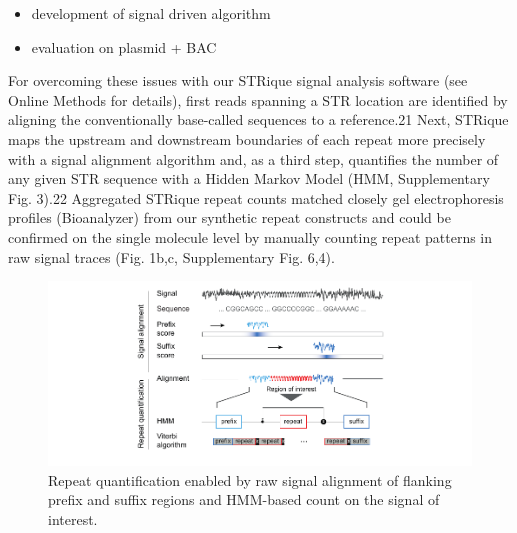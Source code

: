 \begin{itemize}
	\item development of signal driven algorithm
	\item evaluation on plasmid + BAC
\end{itemize}

For overcoming these issues with our STRique signal analysis software (see Online Methods for details), first reads spanning a STR location are identified by aligning the conventionally base-called sequences to a reference.21 Next, STRique maps the upstream and downstream boundaries of each repeat more precisely with a signal alignment algorithm and, as a third step, quantifies the number of any given STR sequence with a Hidden Markov Model (HMM, Supplementary Fig. 3).22 Aggregated STRique repeat counts matched closely gel electrophoresis profiles (Bioanalyzer) from our synthetic repeat constructs and could be confirmed on the single molecule level by manually counting repeat patterns in raw signal traces (Fig. 1b,c, Supplementary Fig. 6,4).

\begin{figure}[h]
	\centering
	\includegraphics[width=1.0\textwidth]{figures/strique/count_structure_plasmid.pdf}
	\captionsetup{format=plain}
	\caption[STRique: generic repeat detection pipeline on raw nanopore signals.]{Repeat quantification enabled by raw signal alignment of flanking prefix and suffix regions and HMM-based count on the signal of interest.}
	\label{fig:strique:count_structure_plasmid}
\end{figure}

